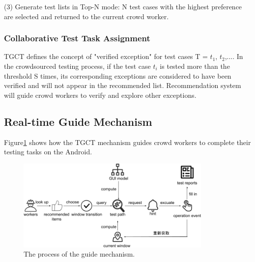 (3) Generate test lists in Top-N mode: N test cases with the highest preference are selected and returned to the current crowd worker.%

\subsubsection{Collaborative Test Task Assignment}
TGCT defines the concept of "verified exception" for test cases T = {$t_{1}$, $t_{2}$,...}. In the crowdsourced testing process, if the test case $t_{i}$ is tested more than the threshold S times, its corresponding exceptions are considered to have been verified and will not appear in the recommended list. Recommendation system will guide crowd workers to verify and explore other exceptions.%

\subsection{Real-time Guide Mechanism}
Figure\ref{fig:guide} shows how the TGCT mechanism guides crowd workers to complete their testing tasks on the Android.
\begin{figure}[htbp]
\centering
\centerline{\includegraphics[width=\columnwidth,height=4.5cm]{fig/10.png}}
\caption{The process of the guide mechanism.}
\label{fig:guide}
\end{figure}


